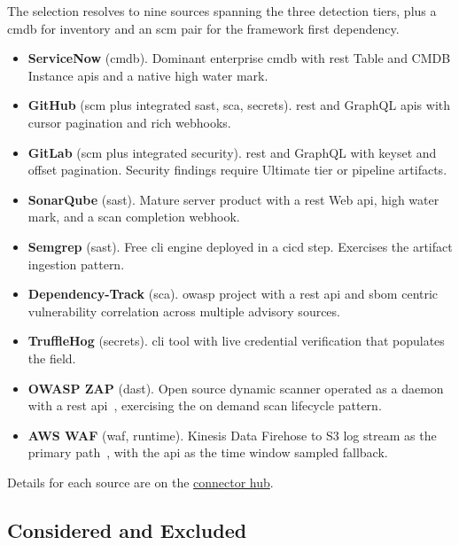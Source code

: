 The selection resolves to nine sources spanning the three detection tiers, plus a \gls{cmdb} for inventory and an \gls{scm} pair for the framework first dependency.

\begin{itemize}
    \item \textbf{ServiceNow} (\gls{cmdb}). Dominant enterprise \gls{cmdb} with \gls{rest} Table and CMDB Instance \glspl{api} and a native  high water mark.
    \item \textbf{GitHub} (\gls{scm} plus integrated \gls{sast}, \gls{sca}, secrets). \Gls{rest} and GraphQL \glspl{api} with cursor pagination and rich webhooks.
    \item \textbf{GitLab} (\gls{scm} plus integrated security). \Gls{rest} and GraphQL with keyset and offset pagination. Security findings require Ultimate tier or pipeline artifacts.
    \item \textbf{SonarQube} (\gls{sast}). Mature server product with a \gls{rest} Web \gls{api},  high water mark, and a scan completion webhook.
    \item \textbf{Semgrep} (\gls{sast}). Free \gls{cli} engine deployed in a \gls{cicd} step. Exercises the artifact ingestion pattern.
    \item \textbf{Dependency-Track} (\gls{sca}). \gls{owasp} project with a \gls{rest} \gls{api} and \gls{sbom} centric vulnerability correlation across multiple advisory sources.
    \item \textbf{TruffleHog} (secrets). \Gls{cli} tool with live credential verification that populates the  field.
    \item \textbf{OWASP ZAP} (\gls{dast}). Open source dynamic scanner operated as a daemon with a \gls{rest} \gls{api}~\parencite{OWASPZAP2024}, exercising the on demand scan lifecycle pattern.
    \item \textbf{AWS WAF} (\gls{waf}, runtime). Kinesis Data Firehose to S3 log stream as the primary path~\parencite{AWSWAF2026}, with the  \gls{api} as the time window sampled fallback.
\end{itemize}

Details for each source are on the \href{https://vkraus.github.io/appsec-mvp/connectors/}{connector hub}.

\subsection{Considered and Excluded}

